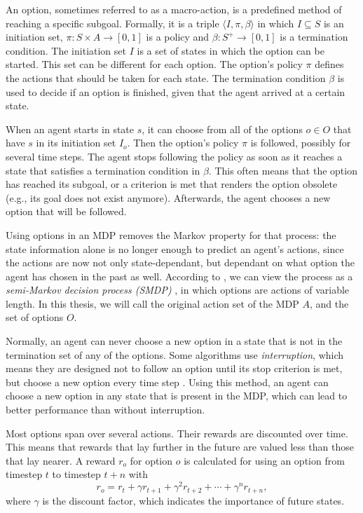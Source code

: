 An option, sometimes referred to as a macro-action, is a predefined method of
reaching a specific subgoal. Formally, it is a triple $\langle I, \pi, \beta
\rangle$ in which $I \subseteq S$ is an initiation set, $\pi: S \times A
\rightarrow [0, 1]$ is a policy and $\beta: S^+ \rightarrow [0,1]$ is a
termination condition. The initiation set $I$ is a set of states in which the
option can be started. This set can be different for each option. The option's
policy $\pi$ defines the actions that should be taken for each state. The
termination condition $\beta$ is used to decide if an option is finished, given
that the agent arrived at a certain state.

When an agent starts in state $s$, it can choose from all of the options $o \in
O$ that have $s$ in its initiation set $I_o$. Then the option's policy $\pi$ is
followed, possibly for several time steps. The agent stops following the policy
as soon as it reaches a state that satisfies a termination condition in $\beta$.
This often means that the option has reached its subgoal, or a criterion is met
that renders the option obsolete (e.g., its goal does not exist anymore).
Afterwards, the agent chooses a new option that will be followed.

Using options in an MDP removes the Markov property for that process: the state
information alone is no longer enough to predict an agent's actions, since the
actions are now not only state-dependant, but dependant on what option the agent
has chosen in the past as well. According to \cite{sutton1999between}, we can
view the process as a \emph{semi-Markov decision process (SMDP)}
\cite{duff1995reinforcement}, in which options are actions of variable length.
In this thesis, we will call the original action set of the MDP $A$, and the set
of options $O$.

Normally, an agent can never choose a new option in a state that is not in the
termination set of any of the options. Some algorithms use \emph{interruption},
which means they are designed not to follow an option until its stop criterion
is met, but choose a new option every time step \cite{sutton1999between,
precup2000temporal}. Using this method, an agent can choose a new option in any
state that is present in the MDP, which can lead to better performance than
without interruption.

Most options span over several actions. Their rewards are discounted over time.
This means that rewards that lay further in the future are valued less than
those that lay nearer. A reward $r_o$ for option $o$ is calculated for using an
option from timestep $t$ to timestep $t+n$ with
\begin{equation}
	\label{eq:option-reward}
	r_o = r_{t} + \gamma r_{t+1} + \gamma^2 r_{t+2} + \cdots + \gamma^n r_{t+n},
\end{equation}
where $\gamma$ is the discount factor, which indicates the importance of future
states. 

